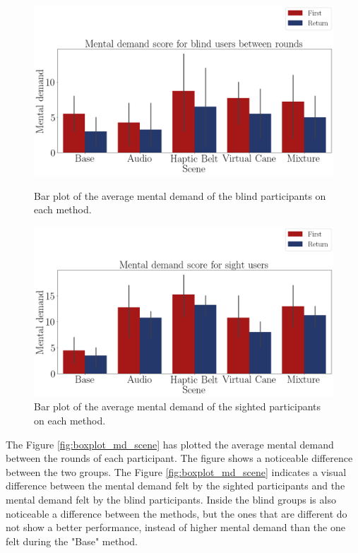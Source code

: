 \begin{figure}[!htb]
    \centering
    \begin{minipage}{\textwidth}
        \centering
        \includegraphics[width = 0.8\linewidth]{Resultados/Nasa/Figuras/png/barplot_md_avg_scene_blind.png}
        \caption{Bar plot of the average mental demand of the blind participants on each method.}
        \label{fig:barplot_md_scene_blind}
    \end{minipage}
    \begin{minipage}{\textwidth}
        \centering
        \includegraphics[width = 0.8\linewidth]{Resultados/Nasa/Figuras/png/barplot_md_avg_scene_sight.png}
        \caption{Bar plot of the average mental demand of the sighted participants on each method.}
        \label{fig:barplot_md_scene_sight}
    \end{minipage}
\end{figure}


The Figure \ref{fig:boxplot_md_scene} has plotted the average mental demand between the rounds of each participant. The figure shows a noticeable difference between the two groups.  The Figure \ref{fig:boxplot_md_scene} indicates a visual difference between the mental demand felt by the sighted participants and the mental demand felt by the blind participants. Inside the blind groups is also noticeable a difference between the methods, but the ones that are different do not show a better performance, instead of higher mental demand than the one felt during the "Base" method.

